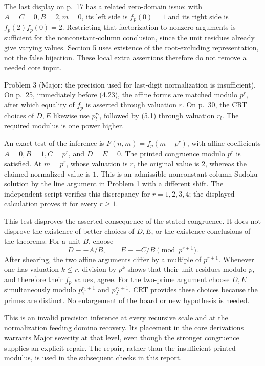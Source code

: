 \documentclass[10pt]{article}
\begin{document}
The last display on p. 17 has a related zero-domain issue: with \(A=C=0,B=2,m=0\), its left side is \(f_p(0)=1\) and its right side is \(f_p(2)f_p(0)=2\). Restricting that factorization to nonzero arguments is sufficient for the nonconstant-column conclusion, since the unit residues already give varying values. Section 5 uses existence of the root-excluding representation, not the false bijection. These local extra assertions therefore do not remove a needed core input.\par
Problem 3 (Major: the precision used for last-digit normalization is insufficient).  On p. 25, immediately before (4.23), the affine forms are matched modulo \(p^r\), after which equality of \(f_p\) is asserted through valuation \(r\). On p. 30, the CRT choices of \(D,E\) likewise use \(p_l^{r_l}\), followed by (5.1) through valuation \(r_l\). The required modulus is one power higher.\par
An exact test of the inference is \(F(n,m)=f_p(m+p^r)\), with affine coefficients \(A=0,B=1,C=p^r\), and \(D=E=0\). The printed congruence modulo \(p^r\) is satisfied. At \(m=p^r\), whose valuation is \(r\), the original value is \(2\), whereas the claimed normalized value is \(1\). This is an admissible nonconstant-column Sudoku solution by the line argument in Problem 1 with a different shift. The independent script verifies this discrepancy for \(r=1,2,3,4\); the displayed calculation proves it for every \(r\ge1\).\par
This test disproves the asserted consequence of the stated congruence. It does not disprove the existence of better choices of \(D,E\), or the existence conclusions of the theorems. For a unit \(B\), choose \[D\equiv-A/B,\qquad E\equiv-C/B\pmod {p^{r+1}}.\] After shearing, the two affine arguments differ by a multiple of \(p^{r+1}\). Whenever one has valuation \(k\le r\), division by \(p^k\) shows that their unit residues modulo \(p\), and therefore their \(f_p\) values, agree. For the two-prime argument choose \(D,E\) simultaneously modulo \(p_1^{r_1+1}\) and \(p_2^{r_2+1}\). CRT provides these choices because the primes are distinct. No enlargement of the board or new hypothesis is needed.\par
This is an invalid precision inference at every recursive scale and at the normalization feeding domino recovery. Its placement in the core derivations warrants Major severity at that level, even though the stronger congruence supplies an explicit repair. The repair, rather than the insufficient printed modulus, is used in the subsequent checks in this report.\par
\end{document}
